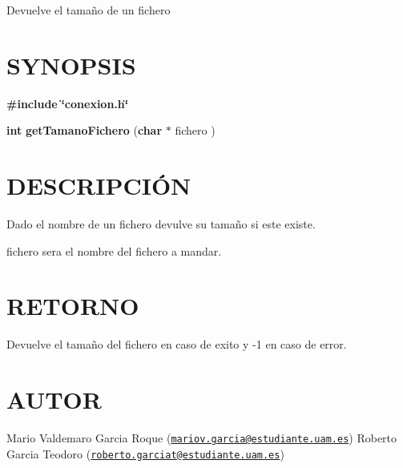 Devuelve el tamaño de un fichero\hypertarget{getTamanoFichero_SYNOPSIS}{}\section{S\-Y\-N\-O\-P\-S\-I\-S}\label{getTamanoFichero_SYNOPSIS}
{\bfseries \#include} {\bfseries \char`\"{}conexion.\-h\char`\"{}} 

{\bfseries int} {\bfseries get\-Tamano\-Fichero} {\bfseries }({\bfseries char} $\ast$ fichero {\bfseries })\hypertarget{getTamanoFichero_descripcion}{}\section{D\-E\-S\-C\-R\-I\-P\-C\-IÓ\-N}\label{getTamanoFichero_descripcion}
Dado el nombre de un fichero devulve su tamaño si este existe.

fichero sera el nombre del fichero a mandar.\hypertarget{getTamanoFichero_retorno}{}\section{R\-E\-T\-O\-R\-N\-O}\label{getTamanoFichero_retorno}
Devuelve el tamaño del fichero en caso de exito y -\/1 en caso de error.\hypertarget{getTamanoFichero_authors}{}\section{A\-U\-T\-O\-R}\label{getTamanoFichero_authors}
Mario Valdemaro Garcia Roque (\href{mailto:mariov.garcia@estudiante.uam.es}{\tt mariov.\-garcia@estudiante.\-uam.\-es}) Roberto Garcia Teodoro (\href{mailto:roberto.garciat@estudiante.uam.es}{\tt roberto.\-garciat@estudiante.\-uam.\-es}) 